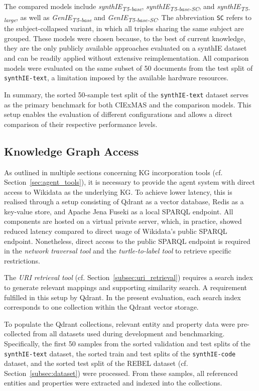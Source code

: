 \documentclass[a4paper,oneside,bibliography=totoc]{scrbook}
\begin{document}
The compared models include \textit{synthIE\textsubscript{T5-base}}, \textit{synthIE\textsubscript{T5-base-SC}}, and \textit{synthIE\textsubscript{T5-large}}, as well as \textit{GenIE\textsubscript{T5-base}} and \textit{GenIE\textsubscript{T5-base-SC}}. The abbreviation \texttt{SC} refers to the subject-collapsed variant, in which all triples sharing the same subject are grouped. These models were chosen because, to the best of current knowledge, they are the only publicly available approaches evaluated on a synthIE dataset and can be readily applied without extensive reimplementation. All comparison models were evaluated on the same subset of 50 documents from the test split of \texttt{synthIE-text}, a limitation imposed by the available hardware resources.

In summary, the sorted 50-sample test split of the \texttt{synthIE-text} dataset serves as the primary benchmark for both CIExMAS and the comparison models. This setup enables the evaluation of different configurations and allows a direct comparison of their respective performance levels.

\subsection{Knowledge Graph Access}
\label{subsec:knowledge_graph_access}

As outlined in multiple sections concerning \ac{KG} incorporation tools (cf. Section~\ref{sec:agent_tools}), it is necessary to provide the agent system with direct access to Wikidata as the underlying \ac{KG}. To achieve lower latency, this is realised through a setup consisting of Qdrant as a vector database, Redis as a key-value store, and Apache Jena Fuseki as a local \ac{SPARQL} endpoint. All components are hosted on a virtual private server, which, in practice, showed reduced latency compared to direct usage of Wikidata's public \ac{SPARQL} endpoint. Nonetheless, direct access to the public \ac{SPARQL} endpoint is required in the \textit{network traversal tool} and the \textit{turtle-to-label tool} to retrieve specific restrictions.

The \textit{\ac{URI} retrieval tool} (cf. Section~\ref{subsec:uri_retrieval}) requires a search index to generate relevant mappings and supporting similarity search. A requirement fulfilled in this setup by Qdrant. In the present evaluation, each search index corresponds to one collection within the Qdrant vector storage.

To populate the Qdrant collections, relevant entity and property data were pre-collected from all datasets used during development and benchmarking. Specifically, the first 50 samples from the sorted validation and test splits of the \texttt{synthIE-text} dataset, the sorted train and test splits of the \texttt{synthIE-code} dataset, and the sorted test split of the REBEL dataset (cf. Section~\ref{subsec:dataset}) were processed. From these samples, all referenced entities and properties were extracted and indexed into the collections.
\end{document}
